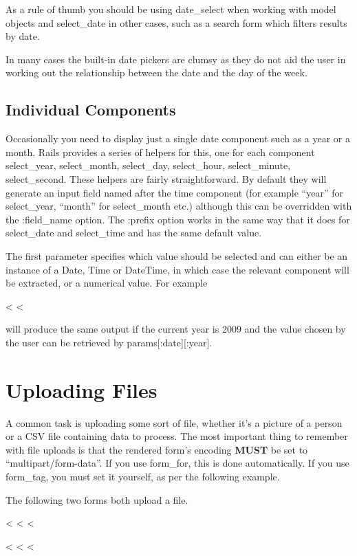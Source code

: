 \documentclass[10pt]{book}
\newenvironment{code}{%
  \scriptsize
    \verbatim
}{%
    \endverbatim
    \newline
}
\begin{document}
As a rule of thumb you should be using date\_select when working with model objects and select\_date in other cases, such as a search form which filters results by date.

In many cases the built-in date pickers are clumsy  as they do not aid the user in working out the relationship between the  date and the day of the week.

\subsection{ Individual Components}

Occasionally you need to display just a single date component such as  a year or a month. Rails provides a series of helpers for this, one for  each component select\_year, select\_month, select\_day, select\_hour, select\_minute, select\_second.  These helpers are fairly straightforward. By default they will generate  an input field named after the time component (for example “year” for select\_year, “month” for select\_month etc.) although this can be overridden with the  :field\_name option. The :prefix option works in the same way that it does for select\_date and select\_time and has the same default value.

The first parameter specifies which value should be selected and can  either be an instance of a Date, Time or DateTime, in which case the  relevant component will be extracted, or a numerical value. For example
\begin{code}
<%
<%
\end{code}

will produce the same output if the current year is 2009 and the value chosen by the user can be retrieved by params[:date][:year].

\section{ Uploading Files}

A common task is uploading some sort of file, whether it’s a picture of a person or a CSV file containing data to process. The most important thing to remember with file uploads is that the rendered form’s encoding \textbf{MUST} be set to “multipart/form-data”. If you use form\_for, this is done automatically. If you use form\_tag, you must set it yourself, as per the following example.

The following two forms both upload a file.
\begin{code}
<%
  <%
<%
 
<%
  <%
<%
\end{code}
\end{document}
